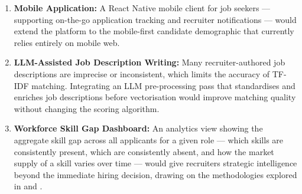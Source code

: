 \documentclass[12pt,a4paper]{report}
\begin{document}
\begin{enumerate}[leftmargin=0.5in, label=\arabic*., topsep=4pt, itemsep=3pt]
    \item \textbf{Mobile Application:} A React Native mobile client for job seekers — supporting on-the-go application tracking and recruiter notifications — would extend the platform to the mobile-first candidate demographic that currently relies entirely on mobile web.

    \item \textbf{LLM-Assisted Job Description Writing:} Many recruiter-authored job descriptions are imprecise or inconsistent, which limits the accuracy of TF-IDF matching. Integrating an LLM pre-processing pass that standardises and enriches job descriptions before vectorisation would improve matching quality without changing the scoring algorithm.

    \item \textbf{Workforce Skill Gap Dashboard:} An analytics view showing the aggregate skill gap across all applicants for a given role — which skills are consistently present, which are consistently absent, and how the market supply of a skill varies over time — would give recruiters strategic intelligence beyond the immediate hiring decision, drawing on the methodologies explored in \cite{ref19} and \cite{ref20}.
\end{enumerate}
\end{document}
